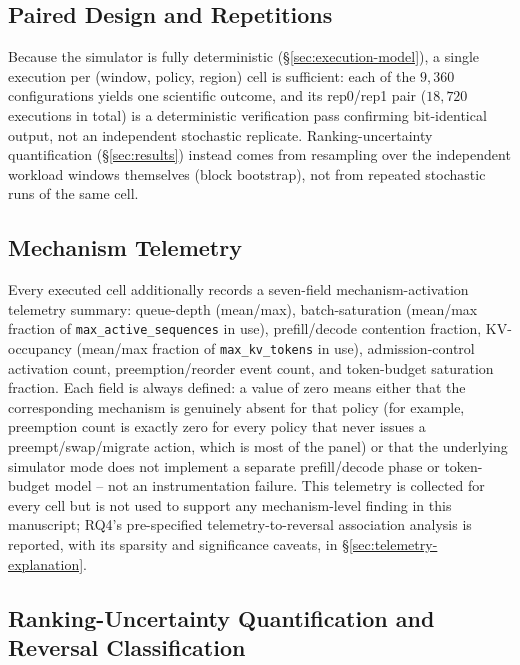 \subsection{Paired Design and Repetitions}
\label{sec:paired}

Because the simulator is fully deterministic (\S\ref{sec:execution-model}),
a single execution per (window, policy, region) cell is sufficient: each of
the $9{,}360$ configurations yields one scientific outcome, and its rep0/rep1
pair ($18{,}720$ executions in total) is a deterministic verification pass
confirming bit-identical output, not an independent stochastic replicate.
Ranking-uncertainty quantification (\S\ref{sec:results}) instead comes from
resampling over the independent workload windows themselves (block
bootstrap), not from repeated stochastic runs of the same cell.

\subsection{Mechanism Telemetry}
\label{sec:telemetry}

Every executed cell additionally records a seven-field mechanism-activation
telemetry summary: queue-depth (mean/max), batch-saturation (mean/max
fraction of \texttt{max\_active\_sequences} in use), prefill/decode
contention fraction, KV-occupancy (mean/max fraction of \texttt{max\_kv\_tokens}
in use), admission-control activation count, preemption/reorder event
count, and token-budget saturation fraction. Each field is always defined:
a value of zero means either that the corresponding mechanism is genuinely
absent for that policy (for example, preemption count is exactly zero for
every policy that never issues a preempt/swap/migrate action, which is most
of the panel) or that the underlying simulator mode does not implement a
separate prefill/decode phase or token-budget model -- not an
instrumentation failure. This telemetry is collected for every cell but is
not used to support any mechanism-level finding in this manuscript; RQ4's
pre-specified telemetry-to-reversal association analysis is reported, with
its sparsity and significance caveats, in \S\ref{sec:telemetry-explanation}.

\subsection{Ranking-Uncertainty Quantification and Reversal Classification}
\label{sec:uncertainty}

